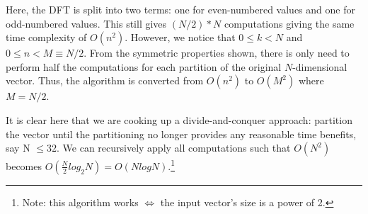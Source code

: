 \documentclass{article}
\begin{document}
Here, the DFT is split into two terms: one for even-numbered values and one for odd-numbered values. This still gives $(N/2) * N$ computations giving the same time complexity of $O(n^2)$. However, we notice that $0 \leq k < N$ and $0 \leq n < M \equiv N/2$. From the symmetric properties shown, there is only need to perform half the computations for each partition of the original $N$-dimensional vector. Thus, the algorithm is converted from $O(n^2)$ to $O(M^2)$ where $M = N/2$.

It is clear here that we are cooking up a divide-and-conquer approach: partition the vector until the partitioning no longer provides any reasonable time benefits, say N $\leq 32$. We can recursively apply all computations such that $O(N^2)$ becomes $O(\frac{N}{2} log_2 N) = O(N log N)$.\footnote{Note: this algorithm works $\iff$ the input vector's size is a power of 2.}
\end{document}
